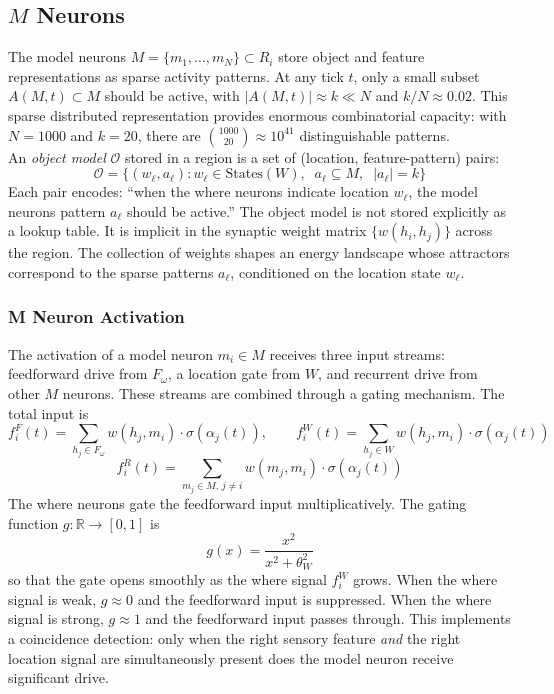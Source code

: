 \documentclass[11pt]{article}
\begin{document}
\subsection{$M$ Neurons}\label{subsec:m_neurons}
The model neurons $M = \{m_1, \ldots, m_N\} \subset R_i$ store object and feature representations as sparse activity patterns. At any tick $t$, only a small subset $A(M, t) \subset M$ should be active, with $|A(M,t)| \approx k \ll N$ and $k/N \approx 0.02$. This sparse distributed representation provides enormous combinatorial capacity: with $N = 1000$ and $k = 20$, there are $\binom{1000}{20} \approx 10^{41}$ distinguishable patterns.\\

An \textit{object model} $\mathcal{O}$ stored in a region is a set of (location, feature-pattern) pairs:
\begin{equation}
    \mathcal{O} = \{(w_\ell, a_\ell) : w_\ell \in \mathrm{States}(W),\;\; a_\ell \subseteq M,\;\; |a_\ell| = k \}
\end{equation}
Each pair encodes: ``when the where neurons indicate location $w_\ell$, the model neurons pattern $a_\ell$ should be active.'' The object model is not stored explicitly as a lookup table. It is implicit in the synaptic weight matrix $\{w(h_i, h_j)\}$ across the region. The collection of weights shapes an energy landscape whose attractors correspond to the sparse patterns $a_\ell$, conditioned on the location state $w_\ell$.

\subsubsection{M Neuron Activation}
The activation of a model neuron $m_i \in M$ receives three input streams: feedforward drive from $F_\omega$, a location gate from $W$, and recurrent drive from other $M$ neurons. These streams are combined through a gating mechanism. The total input is
\begin{equation}
    f_i^F(t) = \sum_{h_j \in F_\omega} w(h_j, m_i) \cdot \sigma(\alpha_j(t)), \qquad f_i^W(t) = \sum_{h_j \in W} w(h_j, m_i) \cdot \sigma(\alpha_j(t))
\end{equation}
\begin{equation}
    f_i^R(t) = \sum_{m_j \in M,\, j \ne i} w(m_j, m_i) \cdot \sigma(\alpha_j(t))
\end{equation}
The where neurons gate the feedforward input multiplicatively. The gating function $g: \mathbb{R} \to [0,1]$ is
\begin{equation}
    g(x) = \frac{x^2}{x^2 + \theta_W^2}
\end{equation}
so that the gate opens smoothly as the where signal $f_i^W$ grows. When the where signal is weak, $g \approx 0$ and the feedforward input is suppressed. When the where signal is strong, $g \approx 1$ and the feedforward input passes through. This implements a coincidence detection: only when the right sensory feature \textit{and} the right location signal are simultaneously present does the model neuron receive significant drive.\\
\end{document}
